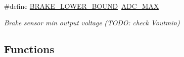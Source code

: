 \begin{DoxyCompactItemize}
\mbox{\label{group___board__model__group_ga0aed20cafcc206360abda47b125432c7}} 
\#define \mbox{\hyperlink{group___board__model__group_ga0aed20cafcc206360abda47b125432c7}{B\+R\+A\+K\+E\+\_\+\+L\+O\+W\+E\+R\+\_\+\+B\+O\+U\+ND}}~\mbox{\hyperlink{group___board__model__group_ga555a695bf58df062dc03f0e892d95cd7}{A\+D\+C\+\_\+\+M\+AX}}
\begin{DoxyCompactList}\small\item\em Brake sensor min output voltage (T\+O\+DO\+: check Voutmin) \end{DoxyCompactList}\end{DoxyCompactItemize}
\subsection*{Functions}
